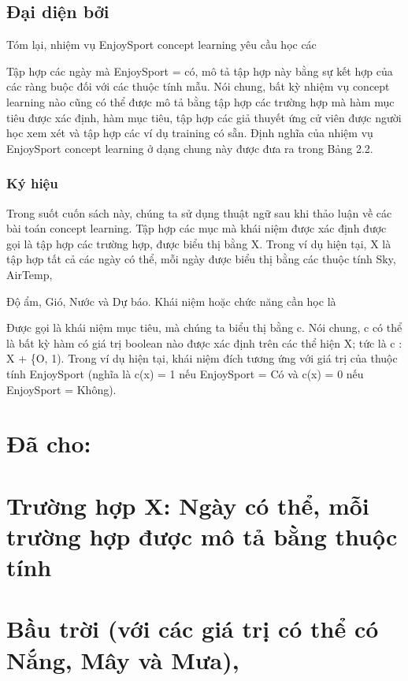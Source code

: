 \subsection{Đại diện bởi}

Tóm lại, nhiệm vụ EnjoySport concept learning yêu cầu học các

Tập hợp các ngày mà EnjoySport = có, mô tả tập hợp này bằng sự kết hợp của các ràng buộc đối với các thuộc tính mẫu. Nói chung, bất kỳ nhiệm vụ concept learning nào cũng có thể được mô tả bằng tập hợp các trường hợp mà hàm mục tiêu được xác định, hàm mục tiêu, tập hợp các giả thuyết ứng cử viên được người học xem xét và tập hợp các ví dụ training có sẵn. Định nghĩa của nhiệm vụ EnjoySport concept learning ở dạng chung này được đưa ra trong Bảng 2.2.

\subsubsection{Ký hiệu}

Trong suốt cuốn sách này, chúng ta sử dụng thuật ngữ sau khi thảo luận về các bài toán concept learning. Tập hợp các mục mà khái niệm được xác định được gọi là tập hợp các trường hợp, được biểu thị bằng X. Trong ví dụ hiện tại, X là tập hợp tất cả các ngày có thể, mỗi ngày được biểu thị bằng các thuộc tính Sky, AirTemp,

Độ ẩm, Gió, Nước và Dự báo. Khái niệm hoặc chức năng cần học là

Được gọi là khái niệm mục tiêu, mà chúng ta biểu thị bằng c. Nói chung, c có thể là bất kỳ hàm có giá trị boolean nào được xác định trên các thể hiện X; tức là c : X + \{O, 1). Trong ví dụ hiện tại, khái niệm đích tương ứng với giá trị của thuộc tính EnjoySport (nghĩa là c(x) = 1 nếu EnjoySport = Có và c(x) = 0 nếu EnjoySport = Không).

\section{Đã cho:}

\section{Trường hợp X: Ngày có thể, mỗi trường hợp được mô tả bằng thuộc tính}

\section{Bầu trời (với các giá trị có thể có Nắng, Mây và Mưa),}

